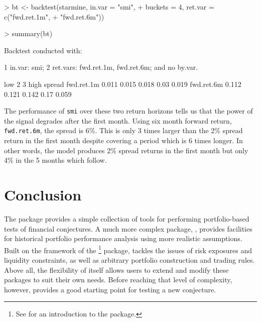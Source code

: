 \documentclass[a4paper]{report}
\begin{document}
\begin{article}
\begin{Schunk}
\begin{Sinput}
> bt <- backtest(starmine, in.var = "smi", 
+     buckets = 4, ret.var = c("fwd.ret.1m", 
+         "fwd.ret.6m"))
\end{Sinput}
\end{Schunk}


\begin{Schunk}
\begin{Sinput}
> summary(bt)
\end{Sinput}
\begin{Soutput}
Backtest conducted with:

1 in.var: smi;
2 ret.vars: fwd.ret.1m, fwd.ret.6m;
and no by.var.

             low     2     3 high spread
fwd.ret.1m 0.011 0.015 0.018 0.03  0.019
fwd.ret.6m 0.112 0.121 0.142 0.17  0.059
\end{Soutput}
\end{Schunk}



The performance of \texttt{smi} over these two return horizons tells
us that the power of the signal degrades after the first month.  Using
six month forward return, \texttt{fwd.ret.6m}, the spread is 6\%.
This is only 3 times larger than the 2\% spread return in the first
month despite covering a period which is 6 times longer. In other
words, the model produces 2\% spread returns in the first month but
only 4\% in the 5 months which follow.


\section*{Conclusion}

The  package provides a simple collection of tools for
performing portfolio-based tests of financial conjectures.  A much
more complex package, , provides facilities for
historical portfolio performance analysis using more realistic
assumptions.  Built on the framework of the
\footnote{See \cite{kane:david} for an introduction to
  the  package.} package,  tackles
the issues of risk exposures and liquidity constraints, as well as
arbitrary portfolio construction and trading rules.  Above all, the
flexibility of \R{} itself allows users to extend and modify these
packages to suit their own needs.  Before reaching that level of
complexity, however,  provides a good starting point for
testing a new conjecture.

  \address{Kyle Campbell, Jeff Enos, Daniel Gerlanc and David Kane \\
    Kane Capital Management \\
    Cambridge, Massachusetts, USA\\
    , ,
     and }



\end{article}
\end{document}
